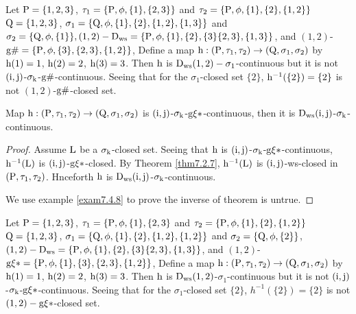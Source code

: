 \begin{exm}\label{exam7.4.6}
Let $\mathrm{P}=\{1, 2, 3\}$, $\tau_1 =\{\mathrm{P}, \phi, \{1\},\{2,3\}\}$ and $\tau_2 =\{\TSP, \phi, \{1\},\{2\},\break \{1, 2\}\}$ $\mathrm{Q}=\{1, 2,3\}$, $\sigma_{1} =\{\mathrm{Q},\phi,\{1\},\{2\},\{1,2\},\{1,3\}\}$ and $\sigma_{2} =\{\mathrm{Q},\phi,\{1\}\},(1,2)-\mathrm{D}_{\mathrm{ws}}=\{\mathrm{P},\phi,\{1\},\{2\},\{3\}\{2,3\},\{1,3\}\}$, and $(1,2)$-$\mathrm{g}\#=\{\mathrm{P}, \phi, \{3\},\{2,3\},\{1,2\}\}$, Define a map $\mathrm{h}: (\mathrm{P}, \tau_1,\tau_2 )\to (\mathrm{Q}, \sigma_{1}, \sigma_{2} )$ by $\mathrm{h}(1)=1$, $\mathrm{h}(2)=2$, $\mathrm{h}(3)=3$. Then $\mathrm{h}$ is $\mathrm{D}_{\mathrm{ws}}(1, 2)-\sigma_{1}$-continuous but it is not $(\mathrm{i},\mathrm{j})$-$\sigma_{\mathrm{k}}$-$\mathrm{g}\#$-continuous. Seeing that for the $\sigma_{1}$-closed set $\{2\}$, $\mathrm{h}^{-1}(\{2\})=\{2\}$ is not $(1, 2)$-$\mathrm{g}\#$-closed set.
\end{exm}

\begin{thm}\label{thm7.4.7}
Map $\mathrm{h}: (\mathrm{P}, \tau_1, \tau_2 )\to (\mathrm{Q}, \sigma_{1}, \sigma_{2} )$ is $(\mathrm{i}, \mathrm{j})$-$\sigma_{\mathrm{k}}$-$\mathrm{g}\xi*$-continuous, then it is $\mathrm{D}_{\mathrm{ws}} (\mathrm{i}, \mathrm{j})$-$\sigma_{\mathrm{k}}$-continuous.
\end{thm}

\begin{proof}
Assume $\mathrm{L}$ be a $\sigma_{\mathrm{k}}$-closed set. Seeing that $\mathrm{h}$ is $(\mathrm{i}, \mathrm{j})$-$\sigma_{\mathrm{k}}$-$\mathrm{g}\xi*$-continuous, $\mathrm{h}^{-1}(\mathrm{L})$ is $(\mathrm{i}, \mathrm{j})$-$\mathrm{g}\xi*$-closed. By Theorem \ref{thm7.2.7}, $\mathrm{h}^{-1}(\mathrm{L})$ is $(\mathrm{i}, \mathrm{j})$-ws-closed in $(\mathrm{P}, \tau_1, \tau_2 )$. Hnceforth $\mathrm{h}$ is $\mathrm{D}_{\mathrm{ws}} (\mathrm{i}, \mathrm{j})$-$\sigma_{\mathrm{k}}$-continuous.

We use example \ref{exam7.4.8} to prove the inverse of theorem is untrue.
\end{proof}

\begin{exm}\label{exam7.4.8}
Let $\mathrm{P}=\{1,2,3\}$, $\tau_1 =\{\mathrm{P}, \phi, \{1\},\{2,3\}$ and $\tau_2 =\{\TSP, \phi, \{1\},\{2\},\break \{1,2\}\}$ $\mathrm{Q}=\{1,2,3\}$, $\sigma_{1} =\{\mathrm{Q}, \phi,\{1\},\{2\},\{1,2\},\{1,2\}\}$ and $\sigma_{2} =\{\mathrm{Q},\phi,\{2\}\}$, $(1,2)- \mathrm{D}_{\mathrm{ws}} =\{\mathrm{P}, \phi, \{1\},\{2\},\{3\}\{2,3\},\{1,3\}\}$, and $(1,2)$-$\TSg\xi*=\{ \TSP, \phi, \{1\},\{3\},\break \{2,3\},\{1,2\}\}$, Define a map $\mathrm{h}: (\mathrm{P}, \tau_1, \tau_2 )\to (\mathrm{Q}, \sigma_{1}, \sigma_{2} )$ by $\mathrm{h}(1)=1$, $\mathrm{h}(2)=2$, $\mathrm{h}(3)=3$. Then $\mathrm{h}$ is $\mathrm{D}_{\mathrm{ws}} (1, 2)$-$\sigma_{1}$-continuous but it is not $(\mathrm{i}, \mathrm{j})$-$\sigma_{\mathrm{k}}$-$\mathrm{g}\xi*$-continuous. Seeing that for the $\sigma_{1}$-closed set $\{2\}$, $h^{-1}(\{2\})=\{2\}$ is not $(1, 2)-\mathrm{g}\xi*$-closed set.
\end{exm}

